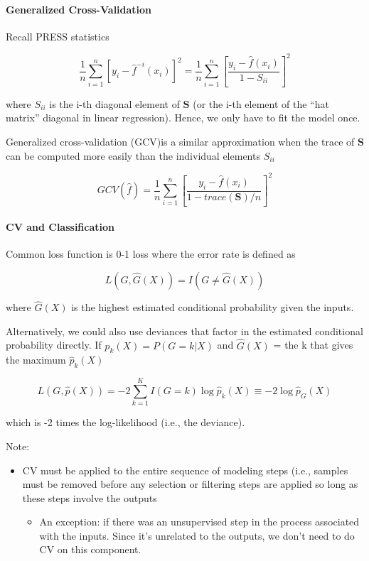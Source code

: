 \documentclass[
]{book}
\providecommand{\tightlist}{%
  \setlength{\itemsep}{0pt}\setlength{\parskip}{0pt}}
\begin{document}
\hypertarget{generalized-cross-validation}{%
\paragraph{Generalized Cross-Validation}\label{generalized-cross-validation}}

Recall PRESS statistics

\[
\frac{1}{n} \sum_{i=1}^n [y_i - \hat{f}^{-i}(x_i)]^2 = \frac{1}{n} \sum_{i=1}^n [\frac{y_i - \hat{f}(x_i)}{1- S_{ii}}]^2
\]

where \(S_{ii}\) is the i-th diagonal element of \(\mathbf{S}\) (or the i-th element of the ``hat matrix'' diagonal in linear regression). Hence, we only have to fit the model once.

Generalized cross-validation (GCV)is a similar approximation when the trace of \(\mathbf{S}\) can be computed more easily than the individual elements \(S_{ii}\)

\[
GCV(\hat{f})= \frac{1}{n} \sum_{i=1}^n [\frac{y_i - \hat{f}(x_i)}{1- trace(\mathbf{S})/n}]^2
\]

\hypertarget{cv-and-classification}{%
\paragraph{CV and Classification}\label{cv-and-classification}}

Common loss function is 0-1 loss where the error rate is defined as

\[
L(G, \hat{G}(X)) = I(G \neq \hat{G}(X))
\]

where \(\hat{G}(X)\) is the highest estimated conditional probability given the inputs.

Alternatively, we could also use deviances that factor in the estimated conditional probability directly. If \(p_k(X) = P(G = k|X)\) and \(\hat{G}(X)\) = the k that gives the maximum \(\hat{p}_k(X)\)

\[
L(G, \hat{p}(X)) = -2 \sum_{k=1}^K I(G = k) \log \hat{p}_k (X) \equiv -2 \log \hat{p}_G (X)
\]

which is -2 times the log-likelihood (i.e., the deviance).

Note:

\begin{itemize}
\item
  CV must be applied to the entire sequence of modeling steps (i.e., samples must be removed before any selection or filtering steps are applied so long as these steps involve the outputs

  \begin{itemize}
  \tightlist
  \item
    An exception: if there was an unsupervised step in the process associated with the inputs. Since it's unrelated to the outputs, we don't need to do CV on this component.
  \end{itemize}
\end{itemize}
\end{document}
